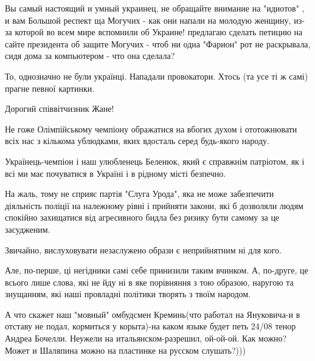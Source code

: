 \begin{itemize}
Вы самый настоящий и умный украинец, не обращайте внимание на "идиотов" , и вам
Большой респект ща Могучих - как они напали на молодую женщину, из-за которой во
всем мире вспомнили об Украине! предлагаю сделать петицию на сайте президента об
защите Могучих - чтоб ни одна "Фарион" рот не раскрывала, сидя дома за
компьютером - что она сделала?


 

То, однозначно не були українці. Нападали провокатори. Хтось (та усе ті ж самі)
прагне певної картинки.

 

Дорогий співвітчизник Жане!

Не гоже Олімпійському чемпіону ображатися на вбогих духом і ототожнювати всіх
нас з кількома ублюдками, яких вдосталь серед будь-якого народу.

Українець-чемпіон і наш улюбленець Беленюк, який є справжнім патріотом, як і
всі ми має почуватися в Україні і в рідному місті безпечно.

На жаль, тому не сприяє партія "Слуга Урода", яка не може забезпечити
діяльність поліції на належному рівні і прийняти закони, які б дозволяли людям
спокійно захищатися від агресивного бидла без ризику бути самому за це
засудженим.

Звичайно, вислуховувати незаслужено образи є неприйнятним ні для кого.

Але, по-перше, ці негідники самі себе принизили таким вчинком. А, по-друге, це
всього лише слова, які не йду ні в яке порівняння з тою образою, наругою та
знущанням, які наші провладні політики творять з твоїм народом.


 

А что скажет наш "мовный" омбудсмен Креминь(что работал на Януковича-и в
отставу не подал, кормиться у корыта)-на каком языке будет петь 24/08 тенор
Андреа Бочелли. Неужели на итальянском-разрешил, ой-ой-ой. Как можно? Может и
Шаляпина можно на пластинке на русском слушать?)))


\end{itemize}
